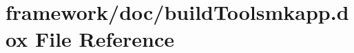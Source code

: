 \hypertarget{build_toolsmkapp_8dox}{}\section{framework/doc/build\+Toolsmkapp.dox File Reference}
\label{build_toolsmkapp_8dox}
